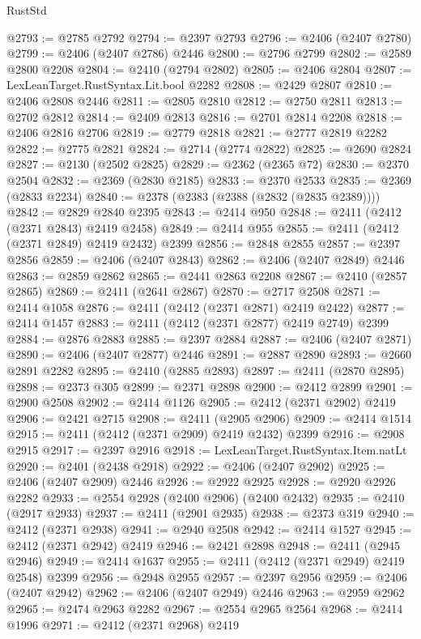 \begin{lexlean}{RustStd}
\begin{coremodule}
@2793 := @2785 @2792
@2794 := @2397 @2793
@2796 := @2406 (@2407 @2780)
@2799 := @2406 (@2407 @2786) @2446
@2800 := @2796 @2799
@2802 := @2589 @2800 @2208
@2804 := @2410 (@2794 @2802)
@2805 := @2406 @2804
@2807 := LexLeanTarget.RustSyntax.Lit.bool @2282
@2808 := @2429 @2807
@2810 := @2406 @2808 @2446
@2811 := @2805 @2810
@2812 := @2750 @2811
@2813 := @2702 @2812
@2814 := @2409 @2813
@2816 := @2701 @2814 @2208
@2818 := @2406 @2816 @2706
@2819 := @2779 @2818
@2821 := @2777 @2819 @2282
@2822 := @2775 @2821
@2824 := @2714 (@2774 @2822)
@2825 := @2690 @2824
@2827 := @2130 (@2502 @2825)
@2829 := @2362 (@2365 @72)
@2830 := @2370 @2504
@2832 := @2369 (@2830 @2185)
@2833 := @2370 @2533
@2835 := @2369 (@2833 @2234)
@2840 := @2378 (@2383 (@2388 (@2832 (@2835 @2389))))
@2842 := @2829 @2840 @2395
@2843 := @2414 @950
@2848 := @2411 (@2412 (@2371 @2843) @2419 @2458)
@2849 := @2414 @955
@2855 := @2411 (@2412 (@2371 @2849) @2419 @2432) @2399
@2856 := @2848 @2855
@2857 := @2397 @2856
@2859 := @2406 (@2407 @2843)
@2862 := @2406 (@2407 @2849) @2446
@2863 := @2859 @2862
@2865 := @2441 @2863 @2208
@2867 := @2410 (@2857 @2865)
@2869 := @2411 (@2641 @2867)
@2870 := @2717 @2508
@2871 := @2414 @1058
@2876 := @2411 (@2412 (@2371 @2871) @2419 @2422)
@2877 := @2414 @1457
@2883 := @2411 (@2412 (@2371 @2877) @2419 @2749) @2399
@2884 := @2876 @2883
@2885 := @2397 @2884
@2887 := @2406 (@2407 @2871)
@2890 := @2406 (@2407 @2877) @2446
@2891 := @2887 @2890
@2893 := @2660 @2891 @2282
@2895 := @2410 (@2885 @2893)
@2897 := @2411 (@2870 @2895)
@2898 := @2373 @305
@2899 := @2371 @2898
@2900 := @2412 @2899
@2901 := @2900 @2508
@2902 := @2414 @1126
@2905 := @2412 (@2371 @2902) @2419
@2906 := @2421 @2715
@2908 := @2411 (@2905 @2906)
@2909 := @2414 @1514
@2915 := @2411 (@2412 (@2371 @2909) @2419 @2432) @2399
@2916 := @2908 @2915
@2917 := @2397 @2916
@2918 := LexLeanTarget.RustSyntax.Item.natLt
@2920 := @2401 (@2438 @2918)
@2922 := @2406 (@2407 @2902)
@2925 := @2406 (@2407 @2909) @2446
@2926 := @2922 @2925
@2928 := @2920 @2926 @2282
@2933 := @2554 @2928 (@2400 @2906) (@2400 @2432)
@2935 := @2410 (@2917 @2933)
@2937 := @2411 (@2901 @2935)
@2938 := @2373 @319
@2940 := @2412 (@2371 @2938)
@2941 := @2940 @2508
@2942 := @2414 @1527
@2945 := @2412 (@2371 @2942) @2419
@2946 := @2421 @2898
@2948 := @2411 (@2945 @2946)
@2949 := @2414 @1637
@2955 := @2411 (@2412 (@2371 @2949) @2419 @2548) @2399
@2956 := @2948 @2955
@2957 := @2397 @2956
@2959 := @2406 (@2407 @2942)
@2962 := @2406 (@2407 @2949) @2446
@2963 := @2959 @2962
@2965 := @2474 @2963 @2282
@2967 := @2554 @2965 @2564
@2968 := @2414 @1996
@2971 := @2412 (@2371 @2968) @2419

\end{coremodule}
\end{lexlean}
